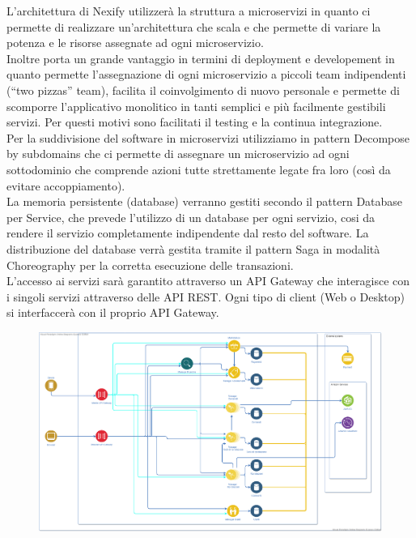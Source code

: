 L’architettura di Nexify utilizzerà la struttura a microservizi in quanto ci permette di realizzare un’architettura che scala e che permette di variare la potenza e le risorse assegnate ad ogni microservizio.\\
Inoltre porta un grande vantaggio in termini di deployment e developement in quanto permette l’assegnazione di ogni microservizio a piccoli team indipendenti (“two pizzas” team), facilita il coinvolgimento di nuovo personale e permette di scomporre l’applicativo monolitico in tanti semplici e più facilmente gestibili servizi. Per questi motivi sono facilitati il testing e la continua integrazione.\\
Per la suddivisione del software in microservizi utilizziamo in pattern Decompose by subdomains che ci permette di assegnare un microservizio ad ogni sottodominio che comprende azioni tutte strettamente legate fra loro (così da evitare accoppiamento).\\
La memoria persistente (database) verranno gestiti secondo il pattern Database per Service, che prevede l’utilizzo di un database per ogni servizio, cosi da rendere il servizio completamente indipendente dal resto del software. La distribuzione del database verrà gestita tramite il pattern Saga in modalità Choreography per la corretta esecuzione delle transazioni.\\
L’accesso ai servizi sarà garantito attraverso un API Gateway che interagisce con i singoli servizi attraverso delle API REST. Ogni tipo di client (Web o Desktop) si interfaccerà con il proprio API Gateway.\\
\begin{figure}[!h]
\centering
\includegraphics[scale=0.24]{../Contents/Diagrams/Design/architecture/Architecture.png}
\end{figure}\\
